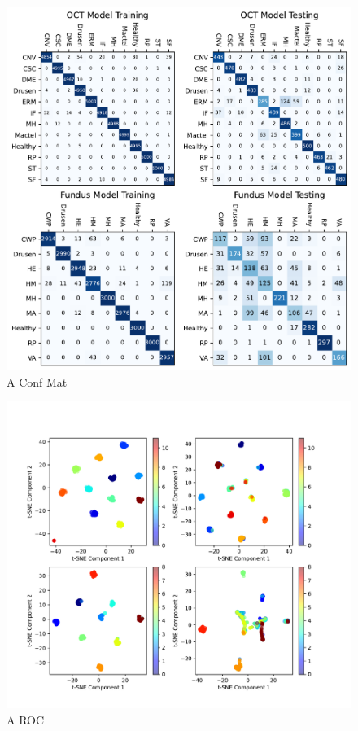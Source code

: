 \documentclass{article}
\begin{document}
	\begin{figure}[htbp]
		\centering
		\includegraphics[width=\linewidth]{Figs/abnormity_confusion_matrix.pdf}
		\caption{A Conf Mat}
		\vspace{0.3cm}
		\label{fig:A_conf_mat}
	\end{figure}
	
	\begin{figure}[htbp]
		\centering
		\includegraphics[width=\linewidth]{Figs/abnormity_tSNE.pdf}
		\caption{A ROC}
		\vspace{0.3cm}
		\label{fig:A_tSNE}
	\end{figure}
	
\end{document}
